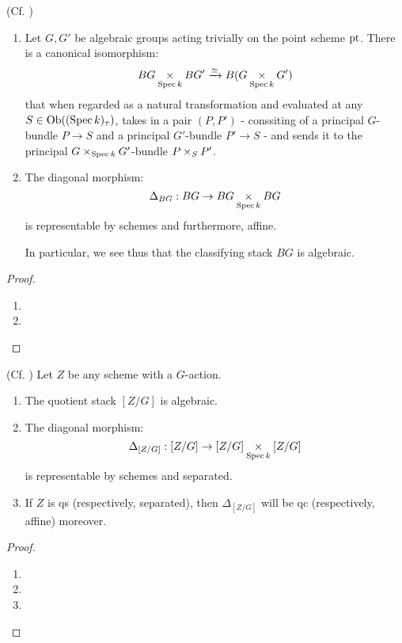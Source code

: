             \begin{lemma} \label{lemma: classifying_stacks_are_algebraic}
                (Cf. \cite[Lemmas 2.5.1 and 2.5.2]{wang_algebraicity_of_Bun_G})
                \begin{enumerate}
                    \item Let $G, G'$ be algebraic groups acting trivially on the point scheme $\mathrm{pt}$. There is a canonical isomorphism:
                        $$BG \x_{\Spec k} BG' \xrightarrow[]{\cong} B(G \x_{\Spec k} G')$$
                    that when regarded as a natural transformation and evaluated at any $S \in \mathrm{Ob}((\operatorname{Spec} k)_{\tau})$, takes in a pair $(P, P')$ - conssiting of a principal $G$-bundle $P \to S$ and a principal $G'$-bundle $P' \to S$ - and sends it to the principal $G \x_{\Spec k} G'$-bundle $P \x_S P'$.
                    \item The diagonal morphism:
                        $$\Delta_{BG}: BG \to BG \x_{\Spec k} BG$$
                    is representable by schemes and furthermore, affine. 

                    In particular, we see thus that the classifying stack $BG$ is algebraic.
                \end{enumerate}
            \end{lemma}
                \begin{proof}
                    \begin{enumerate}
                        \item 
                        \item 
                    \end{enumerate}
                \end{proof}
            \begin{proposition}
                (Cf. \cite[Theorem 2.0.2]{wang_algebraicity_of_Bun_G}) Let $Z$ be any scheme with a $G$-action.
                \begin{enumerate}
                    \item The quotient stack $[Z/G]$ is algebraic.
                    \item The diagonal morphism:
                        $$\Delta_{[Z/G]}: [Z/G] \to [Z/G] \x_{\Spec k} [Z/G]$$
                    is representable by schemes and separated. 
                    \item If $Z$ is qs (respectively, separated), then $\Delta_{[Z/G]}$ will be qc (respectively, affine) moreover.
                \end{enumerate}
            \end{proposition}
                \begin{proof}
                    \begin{enumerate}
                        \item 
                        \item 
                        \item 
                    \end{enumerate}
                \end{proof}

